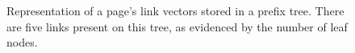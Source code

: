 \begin{figure}[tb]
  \centering
  \resizebox{0.8\textwidth}{!}{}
  \caption{Representation of a page's link vectors stored in
    a prefix tree. There are five links present on this tree, as
    evidenced by the number of leaf nodes.}
\end{figure}
